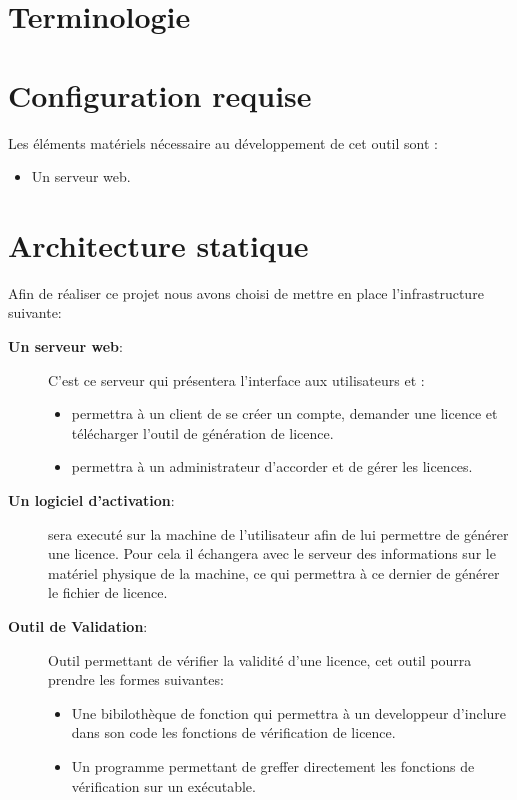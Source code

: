 \chapter{Terminologie}

\chapter{Configuration requise}

Les éléments matériels nécessaire au développement de cet outil sont :
\begin{itemize}
    \item Un serveur web.
\end{itemize}

\chapter{Architecture statique}
Afin de réaliser ce projet nous avons choisi de mettre en place l'infrastructure suivante:

\begin{description}
	\item[\textbf{Un serveur web}:]
				C'est ce serveur qui présentera l'interface aux utilisateurs et :
				\begin{itemize}
					\item permettra à un client de se créer un compte, demander une licence et 
                            télécharger l'outil de génération de licence.
					\item permettra à un administrateur d'accorder et de gérer les licences. 
				\end{itemize}
	\item[\textbf{Un logiciel d'activation}:] 
				sera executé sur la machine de l'utilisateur
				afin de lui permettre de générer une licence. Pour cela il échangera avec
				le serveur des informations sur le matériel physique de la machine, ce 
				qui permettra à ce dernier de générer le fichier de licence.
	\item[\textbf{Outil de Validation}:]
				Outil permettant de vérifier la validité d'une licence, cet outil
				pourra prendre les formes suivantes: 
				\begin{itemize}
				\item Une bibilothèque de fonction qui permettra à un developpeur d'inclure
							dans son code les fonctions de vérification de licence. 
				\item Un programme permettant de greffer directement les fonctions de vérification
							sur un exécutable. 
				\end{itemize}
\end{description}

